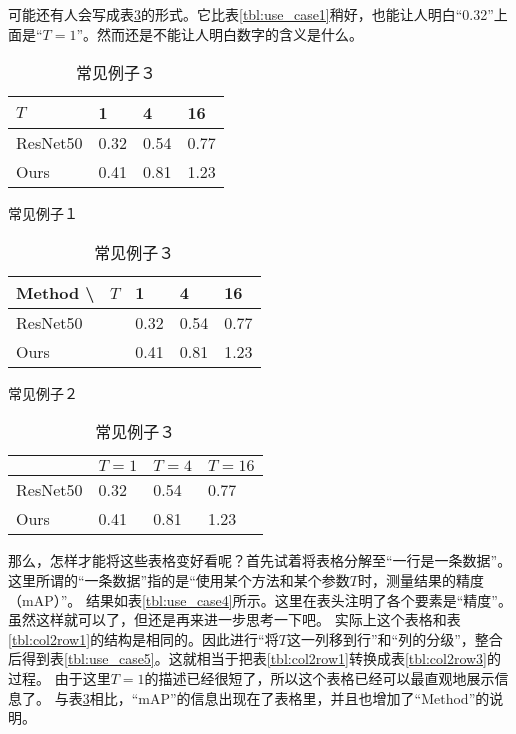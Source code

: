 \documentclass{article}
\newcommand{\Tref}[1]{表\ref{#1}}
\begin{document}
可能还有人会写成\Tref{tbl:use_case3}的形式。它比\Tref{tbl:use_case1}稍好，也能让人明白“0.32”上面是“$T=1$”。然而还是不能让人明白数字的含义是什么。


\begin{table}[h]
    \begin{minipage}{0.32\linewidth}
        \centering
        \begin{tabular}{@{}llll@{}} \toprule
            $T$ & 1 & 4 & 16 \\ \midrule
            ResNet50  & 0.32 & 0.54 & 0.77 \\ 
            Ours      & 0.41 & 0.81 & 1.23 \\ \bottomrule   
        \end{tabular}
        \caption{常见例子１}
        \label{tbl:use_case1}
    \end{minipage}
    \hfill
    \begin{minipage}{0.32\linewidth}
        \centering
        \begin{tabular}{|l|lll|} \hline
            Method \textbackslash ~ $T$ & 1 & 4 & 16 \\ \hline
            ResNet50  & 0.32 & 0.54 & 0.77 \\ 
            Ours      & 0.41 & 0.81 & 1.23 \\ \hline
        \end{tabular}
        \caption{常见例子２}
        \label{tbl:use_case2}
    \end{minipage}
    \hfill
    \begin{minipage}{0.32\linewidth}
        \centering
        \begin{tabular}{@{}llll@{}} \toprule
            & $T=1$ & $T=4$ & $T=16$ \\ \midrule
            ResNet50  & 0.32 & 0.54 & 0.77 \\ 
            Ours      & 0.41 & 0.81 & 1.23 \\ \bottomrule   
        \end{tabular}
        \caption{常见例子３}
        \label{tbl:use_case3}
    \end{minipage}
\end{table}


那么，怎样才能将这些表格变好看呢？首先试着将表格分解至“一行是一条数据”。
这里所谓的“一条数据”指的是“使用某个方法和某个参数$T$时，测量结果的精度（mAP）”。
结果如\Tref{tbl:use_case4}所示。这里在表头注明了各个要素是“精度”。虽然这样就可以了，但还是再来进一步思考一下吧。
实际上这个表格和\Tref{tbl:col2row1}的结构是相同的。因此进行“将$T$这一列移到行”和“列的分级”，整合后得到\Tref{tbl:use_case5}。这就相当于把\Tref{tbl:col2row1}转换成\Tref{tbl:col2row3}的过程。
由于这里$T=1$的描述已经很短了，所以这个表格已经可以最直观地展示信息了。
与\Tref{tbl:use_case3}相比，“mAP”的信息出现在了表格里，并且也增加了“Method”的说明。
\end{document}
